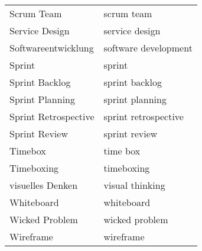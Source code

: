 \begin{spacing}{.5}
\begin{longtable}{ p{} p{}}
    Scrum Team & scrum team \\
    Service Design & service design \\
    Softwareentwicklung & software development \\
    Sprint & sprint \\
    Sprint Backlog & sprint backlog \\
    Sprint Planning & sprint planning \\
    Sprint Retrospective & sprint retrospective \\
    Sprint Review & sprint review \\
    Timebox & time box \\
    Timeboxing & timeboxing \\
    visuelles Denken & visual thinking \\
    Whiteboard & whiteboard \\
    Wicked Problem & wicked problem \\
    Wireframe & wireframe \\
    \hline
\end{longtable}
\end{spacing}
\endgroup


\newpage

